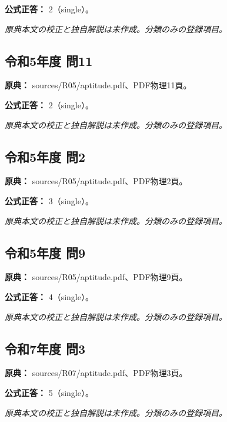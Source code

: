 \textbf{公式正答：} 2（single）。

\par\textit{原典本文の校正と独自解説は未作成。分類のみの登録項目。}

\subsection{令和5年度 問11}
\label{q:r05-reg-apt-11}

\noindent\textbf{原典：} sources/R05/aptitude.pdf、PDF物理11頁。

\textbf{公式正答：} 2（single）。

\par\textit{原典本文の校正と独自解説は未作成。分類のみの登録項目。}

\subsection{令和5年度 問2}
\label{q:r05-reg-apt-02}

\noindent\textbf{原典：} sources/R05/aptitude.pdf、PDF物理2頁。

\textbf{公式正答：} 3（single）。

\par\textit{原典本文の校正と独自解説は未作成。分類のみの登録項目。}

\subsection{令和5年度 問9}
\label{q:r05-reg-apt-09}

\noindent\textbf{原典：} sources/R05/aptitude.pdf、PDF物理9頁。

\textbf{公式正答：} 4（single）。

\par\textit{原典本文の校正と独自解説は未作成。分類のみの登録項目。}

\subsection{令和7年度 問3}
\label{q:r07-reg-apt-03}

\noindent\textbf{原典：} sources/R07/aptitude.pdf、PDF物理3頁。

\textbf{公式正答：} 5（single）。

\par\textit{原典本文の校正と独自解説は未作成。分類のみの登録項目。}
